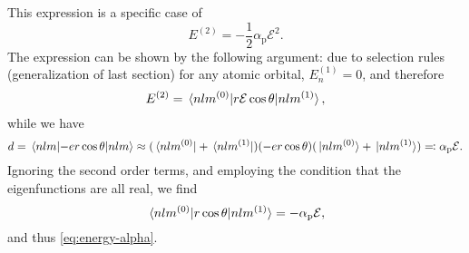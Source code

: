 \documentclass[hyperref, a4paper]{article}
\begin{document}
This expression is a specific case of 
\begin{equation}
    E^{(2)} = - \frac{1}{2} \alpha_{\text{p}} \mathcal{E}^2.
    \label{eq:energy-alpha}
\end{equation}
The expression can be shown by the following argument:
due to selection rules (generalization of last section)
for any atomic orbital, $E_n^{(1)} = 0$,
and therefore 
\begin{equation}
    E^{(2)} = \mel*{nlm^{(0)}}{ r \mathcal{E} \cos \theta}{nlm^{(1)}},
\end{equation}
while we have 
\begin{equation}
    d = \expval{- e r \cos \theta}{nlm}
    \approx (\bra*{nlm^{(0)}} + \bra*{nlm^{(1)}}) (- e r \cos \theta) (\ket*{nlm^{(0)}} + \ket*{nlm^{(1)}})
    \eqqcolon \alpha_{\text{p}} \mathcal{E}. 
\end{equation}
Ignoring the second order terms, 
and employing the condition that the eigenfunctions are all real,
we find 
\[
    \mel*{nlm^{(0)}}{ r\cos \theta}{nlm^{(1)}} = - \alpha_{\text{p}} \mathcal{E},
\]
and thus \eqref{eq:energy-alpha}.
\end{document}
